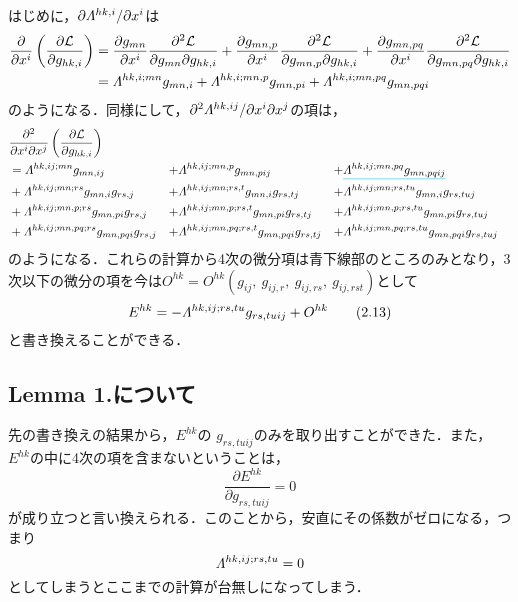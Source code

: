 \documentclass[main]{subfiles}
\begin{document}
はじめに，\(\partial \varLambda^{hk,i} / \partial x^i\)は
\begin{align*}
    \frac{\partial}{\partial x^{i}}\left(\frac{\partial \mathcal{L}}{\partial g_{hk,i}}\right) & = \frac{\partial g_{m n}}{\partial x^{i}} \frac{\partial^{2} \mathcal{L}}{\partial g_{m n} \partial g_{h k, i}}+\frac{\partial g_{m n, p}}{\partial x^{i}} \frac{\partial^{2} \mathcal{L}}{\partial g_{m n, p} \partial g_{h k, i}} +\frac{\partial g_{m n, p q}}{\partial x^{i}} \frac{\partial^{2} \mathcal{L}}{\partial g_{m n, p q} \partial g_{h k, i}} \\
    & = \varLambda^{hk,i;mn} g_{mn,i} +\varLambda^{hk,i;mn,p} g_{mn,pi}+\varLambda^{hk,i;mn,pq} g_{mn,pqi}
\end{align*}
のようになる．同様にして，\(\partial^2 \varLambda^{hk,ij} / \partial x^i \partial x^j\)の項は，
\begin{align*}
    & \frac{\partial^2}{\partial x^{i}\partial x^{j}}\left(\frac{\partial \mathcal{L}}{\partial g_{hk,i}}\right)\\
    & = \varLambda^{hk,ij;mn} g_{mn,ij}& + & \varLambda^{hk,ij;mn,p} g_{mn,pij} & + & \color{cyan}{
    \underline{\textcolor{black}{
    \varLambda^{hk,ij;mn,pq} g_{mn,pqij}
    }}}\\
    & + \varLambda^{hk,ij;mn;rs} g_{mn,i}g_{rs,j}& + & \varLambda^{hk,ij;mn;rs,t} g_{mn,i}g_{rs,tj}      & + & \varLambda^{hk,ij;mn;rs,tu} g_{mn,i}g_{rs,tuj}      \\
    & + \varLambda^{hk,ij;mn,p;rs} g_{mn,pi}g_{rs,j} & + & \varLambda^{hk,ij;mn,p;rs,t} g_{mn,pi}g_{rs,tj}   & + & \varLambda^{hk,ij;mn,p;rs,tu} g_{mn,pi}g_{rs,tuj}   \\
    & + \varLambda^{hk,ij;mn,pq;rs} g_{mn,pqi}g_{rs,j}& + & \varLambda^{hk,ij;mn,pq;rs,t} g_{mn,pqi}g_{rs,tj} & + & \varLambda^{hk,ij;mn,pq;rs,tu} g_{mn,pqi}g_{rs,tuj}
\end{align*}
のようになる．これらの計算から4次の微分項は青下線部のところのみとなり，3次以下の微分の項を今は\(O^{hk} = O^{hk}(g_{ij},\: g_{ij,r}, \: g_{ij,rs},\: g_{ij,rst})\)として
\begin{equation*}
    E^{hk} =- \varLambda^{hk,ij;rs,tu} g_{rs,tuij}+O^{hk}
    \tag{2.13} \label{EL2}
\end{equation*}
と書き換えることができる．

\subsection{Lemma 1.について}
先の書き換えの結果から，\(E^{hk}\)の \(g_{rs,tuij}\)のみを取り出すことができた．また，\(E^{hk}\)の中に4次の項を含まないということは，
\begin{equation*}
    \dfrac{\partial E^{hk}}{\partial g_{rs,tuij} } = 0
\end{equation*}
が成り立つと言い換えられる．このことから，安直にその係数がゼロになる，つまり
\begin{equation*}
    \varLambda^{hk,ij;rs,tu}=0
\end{equation*}
としてしまうとここまでの計算が台無しになってしまう．
\end{document}
